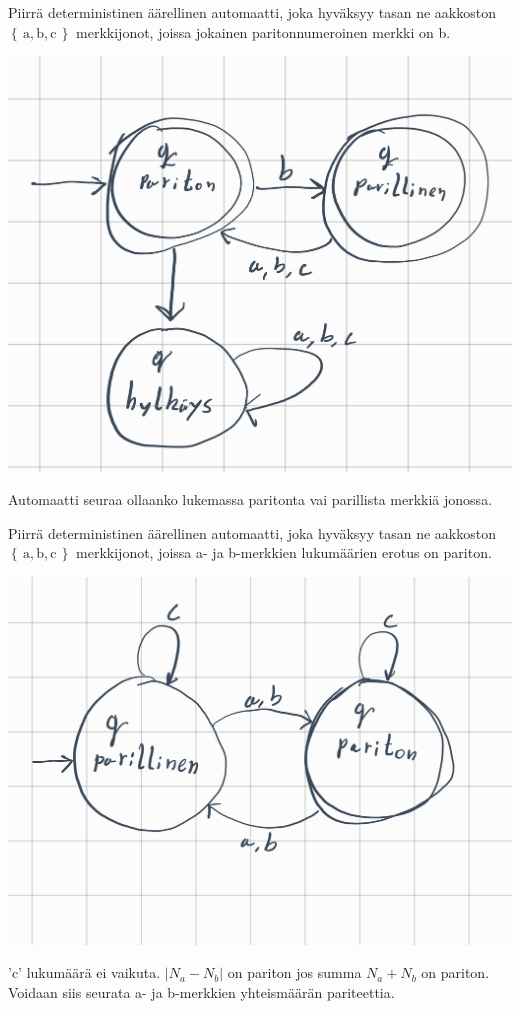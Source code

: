 \documentclass[12pt,a4paper]{article}
\newcommand{\set}[1]{\left\{\,#1\,\right\}}
\begin{document}
\begin{kohta}
\item
Piirrä deterministinen äärellinen automaatti, joka hyväksyy tasan ne 
aakkoston $\set{\mathrm{a},\mathrm{b},\mathrm{c}}$ merkkijonot,
joissa jokainen paritonnumeroinen merkki on b.
\begin{center}
  \includegraphics[width=.6\textwidth]{viikko3tehtävä1c.jpg}
\end{center}
Automaatti seuraa ollaanko lukemassa paritonta vai parillista merkkiä jonossa.

\item
Piirrä deterministinen äärellinen automaatti, joka hyväksyy tasan ne 
aakkoston $\set{\mathrm{a},\mathrm{b},\mathrm{c}}$ merkkijonot,
joissa a- ja b-merkkien lukumäärien erotus on
pariton.
\begin{center}
  \includegraphics[width=.6\textwidth]{viikko3tehtävä1d.jpg}
\end{center}
'c' lukumäärä ei vaikuta. $|N_a - N_b|$ on pariton jos summa $N_a + N_b$
on pariton. Voidaan siis seurata a- ja b-merkkien yhteismäärän pariteettia.

\end{kohta}








\pagebreak
{}
\end{document}
